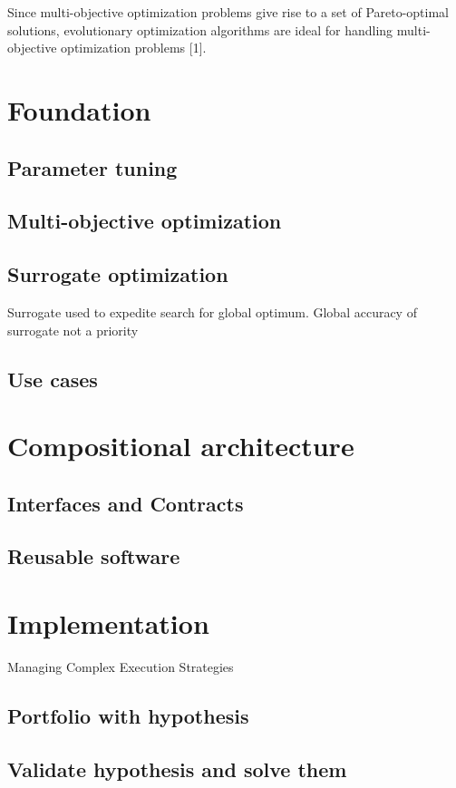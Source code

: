 \documentclass[ms,english]{stthesis}
\begin{document}
            Since multi-objective optimization problems give rise to a set of Pareto-optimal solutions, evolutionary optimization algorithms are ideal for handling multi-objective optimization problems [1].
    
    \chapter{Foundation}
        \section{Parameter tuning}
        \section{Multi-objective optimization}
        \section{Surrogate optimization}
            Surrogate used to expedite search for global optimum. Global accuracy of surrogate
            not a priority
        \section{Use cases}

    \chapter{Compositional architecture}
        \section{Interfaces and Contracts}           
        \section{Reusable software}

    \chapter{Implementation}
        Managing Complex Execution Strategies
        \section{Portfolio with hypothesis}
        \section{Validate hypothesis and solve them}
\end{document}
